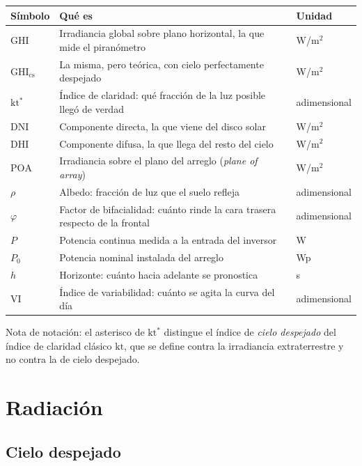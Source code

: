 \documentclass[11pt,a4paper]{article}
\begin{document}
\begin{center}
\small
\begin{tabular}{@{}p{26mm}p{88mm}p{22mm}@{}}
\toprule
\textbf{Símbolo} & \textbf{Qué es} & \textbf{Unidad} \\
\midrule
$\mathrm{GHI}$ & Irradiancia global sobre plano horizontal, la que mide el piranómetro & W/m$^2$ \\
$\mathrm{GHI_{cs}}$ & La misma, pero teórica, con cielo perfectamente despejado & W/m$^2$ \\
$\mathrm{kt^*}$ & Índice de claridad: qué fracción de la luz posible llegó de verdad & adimensional \\
$\mathrm{DNI}$ & Componente directa, la que viene del disco solar & W/m$^2$ \\
$\mathrm{DHI}$ & Componente difusa, la que llega del resto del cielo & W/m$^2$ \\
$\mathrm{POA}$ & Irradiancia sobre el plano del arreglo (\emph{plane of array}) & W/m$^2$ \\
$\rho$ & Albedo: fracción de luz que el suelo refleja & adimensional \\
$\varphi$ & Factor de bifacialidad: cuánto rinde la cara trasera respecto de la frontal & adimensional \\
$P$ & Potencia continua medida a la entrada del inversor & W \\
$P_0$ & Potencia nominal instalada del arreglo & Wp \\
$h$ & Horizonte: cuánto hacia adelante se pronostica & s \\
$\mathrm{VI}$ & Índice de variabilidad: cuánto se agita la curva del día & adimensional \\
\bottomrule
\end{tabular}
\end{center}

Nota de notación: el asterisco de $\mathrm{kt^*}$ distingue el índice de \emph{cielo
despejado} del índice de claridad clásico $\mathrm{kt}$, que se define contra la
irradiancia extraterrestre y no contra la de cielo despejado.

\section{Radiación}

\subsection{Cielo despejado}
\end{document}
